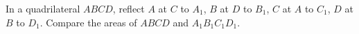 In a quadrilateral $ABCD$, reflect $A$ at $C$ to $A_1$, $B$ at $D$ to $B_1$, $C$ at $A$ to $C_1$, $D$ at $B$ to $D_1$. Compare the areas of $ABCD$ and $A_1B_1C_1D_1$.
